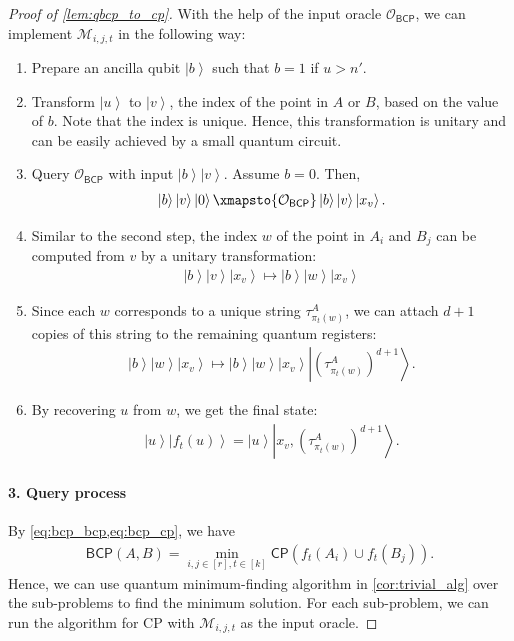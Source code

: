 \documentclass[10pt,a4paper]{article}
\newcommand{\ket}[1]{\left| #1 \right\rangle}
\newcommand{\ora}{\mathcal{O}}
\newcommand{\BCP}{\ensuremath{\mathsf{BCP}}}
\begin{document}
\begin{proof}[Proof of \cref{lem:qbcp_to_cp}]
With the help of the input oracle $\ora_{\BCP}$, we can implement $\mathcal{M}_{i,j,t}$ in the following way: 
\begin{enumerate}
    \item Prepare an ancilla qubit $\ket{b}$ such that $b=1$ if $u>n'$. 
    \item Transform $\ket{u}$ to $\ket{v}$, the index of the point in $A$ or $B$, based on the value of $b$. Note that the index is unique. Hence, this transformation is unitary and can be easily achieved by a small quantum circuit.
    \item Query $\ora_{\BCP}$ with input $\ket{b}\ket{v}$. Assume $b=0$. Then, 
    \begin{align}
        \ket{b}\ket{v}\ket{0}\xmapsto{\ora_{\BCP}}\ket{b}\ket{v}\ket{x_v}.
    \end{align}
    \item Similar to the second step, the index $w$ of the point in $A_i$ and $B_j$ can be computed from $v$ by a unitary transformation:
    \begin{align}
        \ket{b}\ket{v}\ket{x_v}\mapsto \ket{b}\ket{w}\ket{x_v}
    \end{align}
    \item Since each $w$ corresponds to a unique string $\tau^A_{\pi_t(w)}$, we can attach $d+1$ copies of this string to the remaining quantum registers:
    \begin{align}
        \ket{b}\ket{w}\ket{x_v}\mapsto \ket{b}\ket{w}\ket{x_v}\ket{\left( \tau^A_{\pi_t(w)} \right)^{d+1}}.
    \end{align}
    \item By recovering $u$ from $w$, we get the final state:
    \begin{align}
        \ket{u}\ket{f_t(u)}=\ket{u}\ket{x_v,\left( \tau^A_{\pi_t(w)} \right)^{d+1}}.
    \end{align}
\end{enumerate}

\paragraph*{3. Query process}
By \cref{eq:bcp_bcp,eq:bcp_cp}, we have
\begin{align}\label{eq:bcp_all}
    \textsf{BCP}(A,B)=\min_{i,j\in [r],t\in [k]}\textsf{CP}(f_t(A_i)\cup f_t(B_j)).
\end{align}
Hence, we can use quantum minimum-finding algorithm in \cref{cor:trivial_alg} over the sub-problems to find the minimum solution. For each sub-problem, we can run the algorithm for \textsf{CP} with $\mathcal{M}_{i,j,t}$ as the input oracle.


\end{proof}
\end{document}
